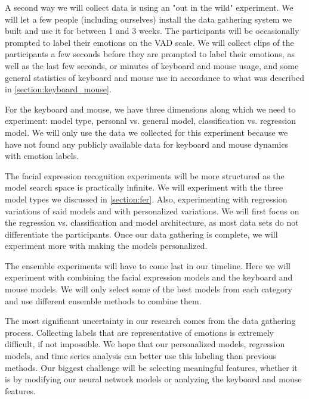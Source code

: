 \documentclass[../main.tex]{subfiles}
\begin{document}
A second way we will collect data is using an "out in the wild" experiment. We will let a few people (including ourselves)
install the data gathering system we built and use it for between 1 and 3 weeks. The participants will be occasionally prompted
to label their emotions on the VAD scale. We will collect clips of the participants a few seconds before they are prompted to
label their emotions, as well as the last few seconds, or minutes of keyboard and mouse usage,
and some general statistics of keyboard and mouse use in accordance to what was described in \ref{section:keyboard_mouse}.
\par

For the keyboard and mouse, we have three dimensions along which we need to experiment: model type, personal vs. general model,
classification vs. regression model. We will only use the data we collected for this experiment because we have not found any publicly
available data for keyboard and mouse dynamics with emotion labels. 
\par

The facial expression recognition experiments will be more structured as the model search space is practically infinite.
We will experiment with the three model types we discussed in \ref{section:fer}. Also, experimenting with regression variations of said
models and with personalized variations. We will first focus on the regression vs. classification and model architecture, as most data sets
do not differentiate the participants. Once our data gathering is complete, we will experiment more with making the models personalized.
\par

The ensemble experiments will have to come last in our timeline. Here we will experiment with combining the facial expression models and the
keyboard and mouse models. We will only select some of the best models from each category and use different ensemble methods to combine them.
\par

The most significant uncertainty in our research comes from the data gathering process. Collecting labels that are representative of emotions
is extremely difficult, if not impossible. We hope that our personalized models, regression models, and time series analysis can better use this
labeling than previous methods. Our biggest challenge will be selecting meaningful features, whether it is by modifying our neural network models
or analyzing the keyboard and mouse features.
\end{document}
